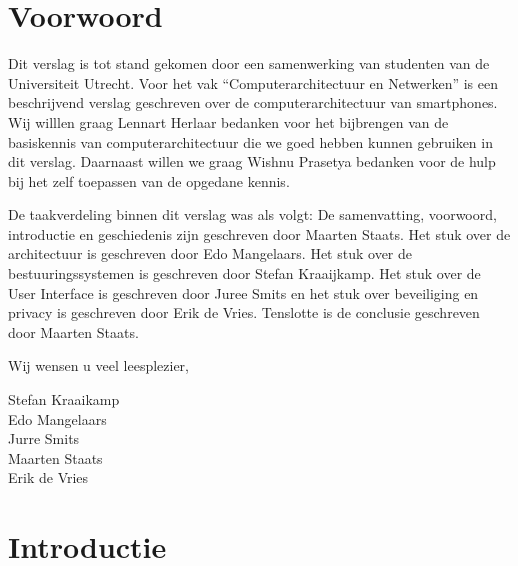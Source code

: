 \chapter{Voorwoord}

Dit verslag is tot stand gekomen door een samenwerking van studenten van de Universiteit Utrecht. Voor het vak ``Computerarchitectuur en Netwerken'' is een beschrijvend verslag geschreven over de computerarchitectuur van smartphones. Wij willlen graag Lennart Herlaar bedanken voor het bijbrengen van de basiskennis van computerarchitectuur die we goed hebben kunnen gebruiken in dit verslag. Daarnaast willen we graag Wishnu Prasetya bedanken voor de hulp bij het zelf toepassen van de opgedane kennis.

De taakverdeling binnen dit verslag was als volgt: De samenvatting, voorwoord, introductie en geschiedenis zijn geschreven door Maarten Staats. Het stuk over de architectuur is geschreven door Edo Mangelaars. Het stuk over de bestuuringssystemen is geschreven door Stefan Kraaijkamp. Het stuk over de User Interface is geschreven door Juree Smits en het stuk over beveiliging en privacy is geschreven door Erik de Vries. Tenslotte is de conclusie geschreven door Maarten Staats.

Wij wensen u veel leesplezier,

Stefan Kraaikamp\\
Edo Mangelaars\\
Jurre Smits\\
Maarten Staats\\
Erik de Vries

\chapter{Introductie}

